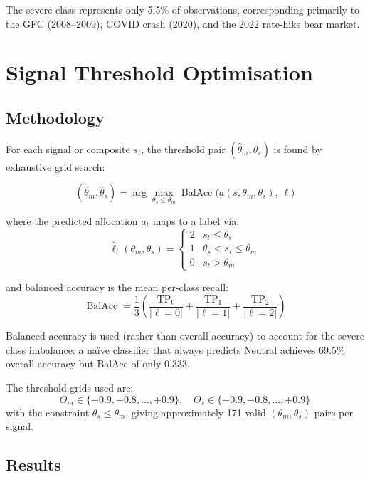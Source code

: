 \documentclass[11pt, a4paper]{article}
\begin{document}
The severe class represents only 5.5\% of observations, corresponding
primarily to the GFC (2008--2009), COVID crash (2020), and the 2022 rate-hike
bear market.

\section{Signal Threshold Optimisation}
\label{sec:threshold}

\subsection{Methodology}

For each signal or composite $s_t$, the threshold pair
$(\hat{\theta}_m, \hat{\theta}_s)$ is found by exhaustive grid search:

\[
  (\hat{\theta}_m, \hat{\theta}_s) = \arg\max_{\theta_s \leq \theta_m}
  \operatorname{BalAcc}\!\bigl(a(s, \theta_m, \theta_s),\, \ell\bigr)
\]

where the predicted allocation $a_t$ maps to a label via:
\[
  \hat{\ell}_t(\theta_m, \theta_s) =
  \begin{cases}
    2 & s_t \leq \theta_s \\
    1 & \theta_s < s_t \leq \theta_m \\
    0 & s_t > \theta_m
  \end{cases}
\]

and balanced accuracy is the mean per-class recall:
\[
  \operatorname{BalAcc} = \frac{1}{3}\left(
    \frac{\mathrm{TP}_0}{|\ell=0|} +
    \frac{\mathrm{TP}_1}{|\ell=1|} +
    \frac{\mathrm{TP}_2}{|\ell=2|}
  \right)
\]

Balanced accuracy is used (rather than overall accuracy) to account for
the severe class imbalance: a na\"{i}ve classifier that always predicts
Neutral achieves 69.5\% overall accuracy but BalAcc of only 0.333.

The threshold grids used are:
\[
  \Theta_m \in \{-0.9, -0.8, \ldots, +0.9\},\quad
  \Theta_s \in \{-0.9, -0.8, \ldots, +0.9\}
\]
with the constraint $\theta_s \leq \theta_m$, giving approximately 171 valid
$(\theta_m, \theta_s)$ pairs per signal.

\subsection{Results}
\end{document}
